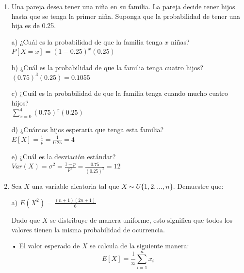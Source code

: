 \documentclass[a4paper, 12pt]{article}
\newcommand{\Pspace}{0.5cm}
\newcommand{\Aspace}{0.2cm}
\begin{document}
\begin{enumerate}
    \vspace{\Pspace}
    \item Una pareja desea tener una niña en su familia. La pareja decide tener hijos hasta que se tenga la primer niña. Suponga que la probabilidad de tener una hija es de 0.25. 
    \vspace{\Aspace} \par
    a) ¿Cuál es la probabilidad de que la familia tenga $x$ niñas?
    \\ { \color{azul} $P[X = x] = (1 - 0{.}25)^{x}(0{.}25)$ }

    \vspace{\Aspace} \par
    b) ¿Cuál es la probabilidad de que la familia tenga cuatro hijos?
    \\ { \color{azul} $(0{.}75)^{3}(0{.}25) = 0{.}1055$ }

    \vspace{\Aspace} \par
    c) ¿Cuál es la probabilidad de que la familia tenga cuando mucho cuatro hijos?
    \\ { \color{azul} $\sum\limits_{x = 0}^{4} (0{.}75)^{x}(0{.}25)$ }

    \vspace{\Aspace} \par
    d) ¿Cuántos hijos esperaría que tenga esta familia?
    \\ { \color{azul} $E[X] = \frac{1}{p} = \frac{1}{0{.}25} = 4$ }

    \vspace{\Aspace} \par
    e) ¿Cuál es la desviación estándar?
    \\ { \color{azul} $Var(X) = \sigma^{2} = \frac{1 - p}{p^{2}} = \frac{0{.}75}{(0{.}25)^{2}} = 12$ }

    
    \newpage
    \vspace{\Pspace}
    \item Sea $X$ una variable aleatoria tal que $ X \sim U\{1, 2, \dots, n\} $. Demuestre que:
    \vspace{\Aspace} \par
    a) $E(X^{2}) = \frac{(n + 1)(2n + 1)}{6}$
    \\ { \color{azul} 
        Dado que $X$ se distribuye de manera uniforme, esto significa que todos los valores tienen la misma probabilidad de ocurrencia.
        \par • El valor esperado de $X$ se calcula de la siguiente manera:
        \[ E[X] = \frac{1}{n} \sum\limits_{i = 1}^{n} x_{i} \]
        
}
\end{enumerate}
\end{document}

